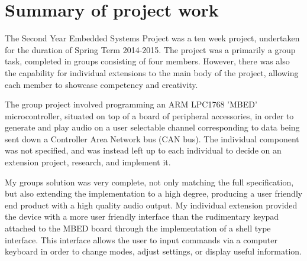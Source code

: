 \section{Summary of project work}
The Second Year Embedded Systems Project was a ten week project, undertaken 
for the duration of Spring Term 2014-2015. 
The project was a primarily a group task, completed in groups consisting of four 
members. 
However, there was also the capability for individual extensions to the main 
body of the project, allowing each member to showcase competency and creativity.
\par\bigskip\noindent
The group project involved programming an ARM LPC1768 'MBED' microcontroller, 
situated on top of a board of peripheral accessories, in order to 
generate and play audio on a user selectable channel corresponding to data 
being sent down a Controller Area Network bus (CAN bus). 
The individual component was not specified, and was instead left up to each 
individual to decide on an extension project, research, and implement it. 
\par\bigskip\noindent
My groups solution was very complete, not only matching the full specification, 
but also extending the implementation to a high degree, producing a user 
friendly end product with a high quality audio output. 
My individual extension provided the device with a more user friendly 
interface than the rudimentary keypad attached to the MBED board through the 
implementation of a shell type interface. 
This interface allows the user to input commands via a computer keyboard in 
order to change modes, adjust settings, or display useful information.

 
